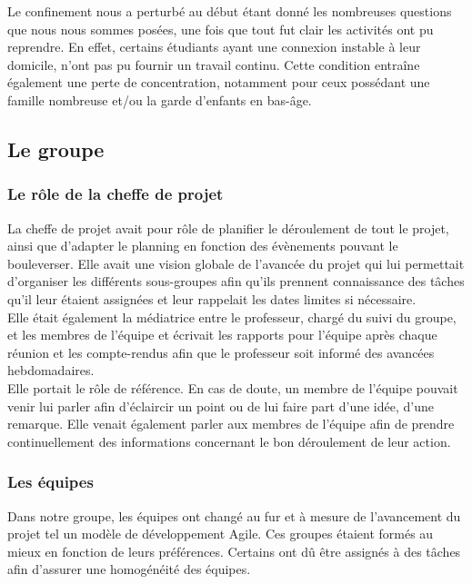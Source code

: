 \documentclass[a4paper,11pt]{article}
\begin{document}
    Le confinement nous a perturbé au début étant donné les nombreuses questions que nous nous sommes posées, une fois que tout fut clair les activités ont pu reprendre. En effet, certains étudiants ayant une connexion instable à leur domicile, n’ont pas pu fournir un travail continu. Cette condition entraîne également une perte de concentration, notamment pour ceux possédant une famille nombreuse et/ou la garde d’enfants en bas-âge.


\subsection{Le groupe}

\subsubsection{Le rôle de la cheffe de projet}

    La cheffe de projet avait pour rôle de planifier le déroulement de tout le projet, ainsi que d'adapter le planning en fonction des évènements pouvant le bouleverser. Elle avait une vision globale de l’avancée du projet qui lui permettait d’organiser les différents sous-groupes afin qu’ils prennent connaissance des tâches qu’il leur étaient assignées et  leur rappelait les dates limites si nécessaire. \\

    Elle était également la médiatrice entre le professeur, chargé du suivi du groupe, et les membres de l’équipe et écrivait les rapports pour l’équipe après chaque réunion et les compte-rendus afin que le professeur soit informé des avancées hebdomadaires. \\
	
    Elle portait le rôle de référence. En cas de doute, un membre de l’équipe pouvait venir lui parler afin d’éclaircir un point ou de lui faire part d’une idée, d’une remarque. Elle venait également parler aux membres de l’équipe afin de prendre continuellement des informations concernant le bon déroulement de leur action.

\subsubsection{Les équipes}


    Dans notre groupe, les équipes ont changé au fur et à mesure de l’avancement du projet tel un modèle de développement Agile. Ces groupes étaient formés au mieux en fonction de leurs préférences. Certains ont dû être assignés à des tâches afin d’assurer une homogénéité des équipes. \\
\end{document}
